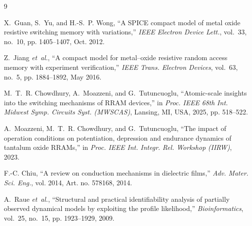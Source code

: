 \documentclass[journal]{IEEEtran}
\begin{document}
\begin{thebibliography}{9}\footnotesize

X.~Guan, S.~Yu, and H.-S.~P. Wong, ``A SPICE compact model of metal oxide
resistive switching memory with variations,'' \emph{IEEE Electron Device
Lett.}, vol.~33, no.~10, pp. 1405--1407, Oct. 2012.

Z.~Jiang \emph{et~al.}, ``A compact model for metal--oxide resistive random
access memory with experiment verification,'' \emph{IEEE Trans. Electron
Devices}, vol.~63, no.~5, pp. 1884--1892, May 2016.

M.~T.~R. Chowdhury, A.~Moazzeni, and G.~Tutuncuoglu, ``Atomic-scale insights
into the switching mechanisms of RRAM devices,'' in \emph{Proc. IEEE 68th
Int. Midwest Symp. Circuits Syst. (MWSCAS)}, Lansing, MI, USA, 2025,
pp. 518--522.

A.~Moazzeni, M.~T.~R. Chowdhury, and G.~Tutuncuoglu, ``The impact of operation
conditions on potentiation, depression and endurance dynamics of tantalum
oxide RRAMs,'' in \emph{Proc. IEEE Int. Integr. Rel. Workshop (IIRW)}, 2023.

F.-C. Chiu, ``A review on conduction mechanisms in dielectric films,''
\emph{Adv. Mater. Sci. Eng.}, vol. 2014, Art. no. 578168, 2014.

A.~Raue \emph{et~al.}, ``Structural and practical identifiability analysis of
partially observed dynamical models by exploiting the profile likelihood,''
\emph{Bioinformatics}, vol.~25, no.~15, pp. 1923--1929, 2009.

\end{thebibliography}
\end{document}

